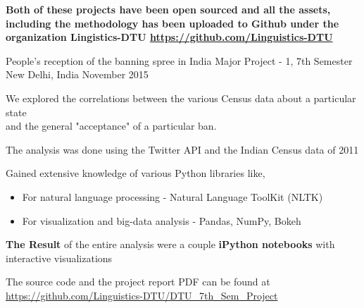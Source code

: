 \textbf{Both of these projects have been open sourced and all the assets, including the methodology has been uploaded to Github under the organization Lingistics-DTU \url{https://github.com/Linguistics-DTU}}
\newline
\begin{cventries}
  \cventry
    {People's reception of the banning spree in India}
    {Major Project - 1, 7th Semester }
    {New Delhi, India }
    {November 2015}
    {
      \begin{cvitems}
        \item {We explored the correlations between the various Census data about a particular state\\ \hspace{1cm} and the general "acceptance" of a particular ban. }
        \item {The analysis was done using the Twitter API and the Indian Census data of 2011 }
        \item {Gained extensive knowledge of various Python libraries like, }
\begin{itemize}
  \item For natural language processing - Natural Language ToolKit (NLTK)
  \item For visualization and big-data analysis - Pandas, NumPy, Bokeh
\end{itemize}        
        \item{\textbf{The Result} of the entire analysis were a couple \textbf{iPython notebooks} with interactive visualizations}
        \item{The source code and the project report PDF can be found at \\ \url{https://github.com/Linguistics-DTU/DTU_7th_Sem_Project}}
      \end{cvitems}
    }


\end{cventries}
